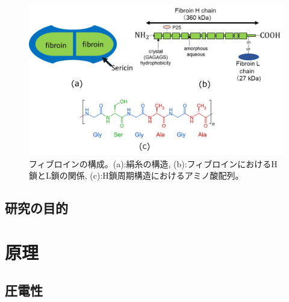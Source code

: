 \documentclass[dvipdfmx,12pt,a4paper]{jreport}
\begin{document}
		\begin{figure}[h]
			\centering
			\includegraphics[width=\linewidth]{fibroin_structure.jpg}
			\caption{フィブロインの構成。(a):絹糸の構造, (b):フィブロインにおけるH鎖とL鎖の関係, 
			(c):H鎖周期構造におけるアミノ酸配列。}
			\label{fibroin}
		\end{figure}

		\newpage
		\section{研究の目的}

	\chapter{原理}
		\section{圧電性}
\end{document}
